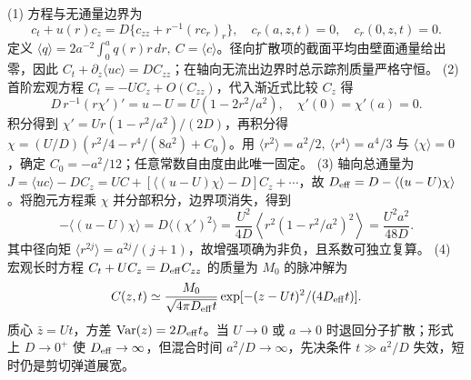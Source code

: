 (1) 方程与无通量边界为
\[
c_t+u(r)c_z=D\{c_{zz}+r^{-1}(rc_r)_r\},\quad c_r(a,z,t)=0,\quad c_r(0,z,t)=0.
\]
定义 \(\langle q\rangle=2a^{-2}\int_0^a q(r)r\,dr,\ C=\langle c\rangle\)。径向扩散项的截面平均由壁面通量给出零，因此 \(C_t+\partial_z\langle uc\rangle=D C_{zz}\)；在轴向无流出边界时总示踪剂质量严格守恒。
(2) 首阶宏观方程 \(C_t=-U C_z+O(C_{zz})\)，代入渐近式比较 \(C_z\) 得
\[
D\,r^{-1}(r\chi')'=u-U=U(1-2r^2/a^2),\quad \chi'(0)=\chi'(a)=0.
\]
积分得到 \(\chi'=Ur(1-r^2/a^2)/(2D)\)，再积分得 \(\chi=(U/D)(r^2/4-r^4/(8a^2)+C_0)\)。用 \(\langle r^2\rangle=a^2/2,\ \langle r^4\rangle=a^4/3\) 与 \(\langle\chi\rangle=0\)，确定 \(C_0=-a^2/12\)；任意常数自由度由此唯一固定。
(3) 轴向总通量为 \(J=\langle uc\rangle-D C_z=UC+[\langle(u-U)\chi\rangle-D]C_z+\cdots\)，故 \(D_{\rm eff}=D-\langle(u-U)\chi\rangle\)。将胞元方程乘 \(\chi\) 并分部积分，边界项消失，得到
\[
-\langle(u-U)\chi\rangle=D\langle(\chi')^2\rangle
=\frac{U^2}{4D}\left\langle r^2(1-r^2/a^2)^2\right\rangle
=\frac{U^2a^2}{48D}.
\]
其中径向矩 \(\langle r^{2j}\rangle=a^{2j}/(j+1)\)，故增强项确为非负，且系数可独立复算。
(4) 宏观长时方程 \(C_t+UC_z=D_{\rm eff}C_{zz}\) 的质量为 \(M_0\) 的脉冲解为
\[
C(z,t)\simeq\frac{M_0}{\sqrt{4\pi D_{\rm eff}t}}\exp[-(z-Ut)^2/(4D_{\rm eff}t)].
\]
质心 \(\bar z=Ut\)，方差 \({\rm Var}(z)=2D_{\rm eff}t\)。当 \(U\to0\) 或 \(a\to0\) 时退回分子扩散；形式上 \(D\to0^+\) 使 \(D_{\rm eff}\to\infty\)，但混合时间 \(a^2/D\to\infty\)，先决条件 \(t\gg a^2/D\) 失效，短时仍是剪切弹道展宽。
